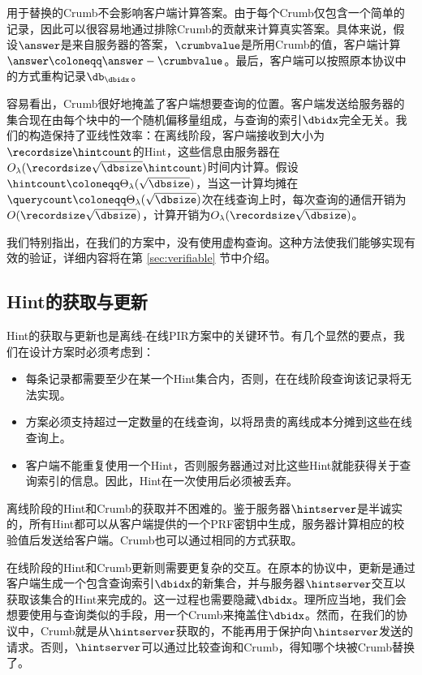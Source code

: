 用于替换的Crumb不会影响客户端计算答案。由于每个Crumb仅包含一个简单的记录，因此可以很容易地通过排除Crumb的贡献来计算真实答案。具体来说，假设$\answer$是来自服务器的答案，$\crumbvalue$是所用Crumb的值，客户端计算$\answer \coloneqq \answer - \crumbvalue$。最后，客户端可以按照原本协议中的方式重构记录$\db_\dbidx$。

容易看出，Crumb很好地掩盖了客户端想要查询的位置。客户端发送给服务器的集合现在由每个块中的一个随机偏移量组成，与查询的索引$\dbidx$完全无关。我们的构造保持了亚线性效率：在离线阶段，客户端接收到大小为$\recordsize\hintcount$的Hint，这些信息由服务器在$O_\lambda(\recordsize\sqrt{\dbsize}\hintcount)$时间内计算。假设$\hintcount\coloneqq \Theta_\lambda(\sqrt{\dbsize})$，当这一计算均摊在$\querycount\coloneqq\Theta_\lambda(\sqrt{\dbsize})$次在线查询上时，每次查询的通信开销为$O(\recordsize\sqrt{\dbsize})$，计算开销为$O_\lambda(\recordsize\sqrt{\dbsize})$。

我们特别指出，在我们的方案中，没有使用虚构查询。这种方法使我们能够实现有效的验证，详细内容将在第 \ref{sec:verifiable} 节中介绍。

\subsection{Hint的获取与更新}
Hint的获取与更新也是离线-在线PIR方案中的关键环节。有几个显然的要点，我们在设计方案时必须考虑到：
\begin{itemize}
    \item 每条记录都需要至少在某一个Hint集合内，否则，在在线阶段查询该记录将无法实现。
    \item 方案必须支持超过一定数量的在线查询，以将昂贵的离线成本分摊到这些在线查询上。
    \item 客户端不能重复使用一个Hint，否则服务器通过对比这些Hint就能获得关于查询索引的信息。因此，Hint在一次使用后必须被丢弃。
\end{itemize}

离线阶段的Hint和Crumb的获取并不困难的。鉴于服务器$\hintserver$是半诚实的，所有Hint都可以从客户端提供的一个PRF密钥中生成，服务器计算相应的校验值后发送给客户端。Crumb也可以通过相同的方式获取。

在线阶段的Hint和Crumb更新则需要更复杂的交互。在原本的协议中，更新是通过客户端生成一个包含查询索引$\dbidx$的新集合，并与服务器$\hintserver$交互以获取该集合的Hint来完成的。这一过程也需要隐藏$\dbidx$。理所应当地，我们会想要使用与查询类似的手段，用一个Crumb来掩盖住$\dbidx$。然而，在我们的协议中，Crumb就是从$\hintserver$获取的，不能再用于保护向$\hintserver$发送的请求。否则，$\hintserver$可以通过比较查询和Crumb，得知哪个块被Crumb替换了。

